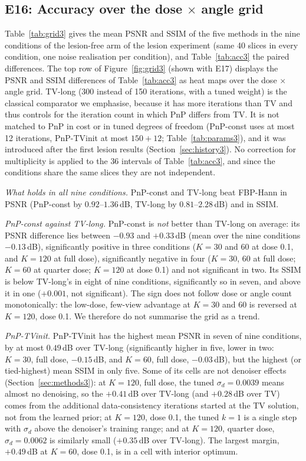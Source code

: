 \subsection{E16: Accuracy over the dose $\times$ angle grid}\label{sec:e16}
Table~\ref{tab:grid3} gives the mean PSNR and SSIM of the five methods in the nine conditions of the lesion-free arm of the lesion experiment (same 40 slices in every condition, one noise realisation per condition), and Table~\ref{tab:acc3} the paired differences. The top row of Figure~\ref{fig:grid3} (shown with E17) displays the PSNR and SSIM differences of Table~\ref{tab:acc3} as heat maps over the dose $\times$ angle grid.
TV-long (300 instead of 150 iterations, with a tuned weight) is the classical comparator we emphasise, because it has more iterations than TV and thus controls for the iteration count in which PnP differs from TV. It is not matched to PnP in cost or in tuned degrees of freedom (PnP-const uses at most 12 iterations, PnP-TVinit at most $150+12$; Table~\ref{tab:params3}), and it was introduced after the first lesion results (Section~\ref{sec:history3}). No correction for multiplicity is applied to the $36$ intervals of Table~\ref{tab:acc3}, and since the conditions share the same slices they are not independent.

\emph{What holds in all nine conditions.} PnP-const and TV-long beat FBP-Hann in PSNR (PnP-const by $0.92$--$1.36$\,dB, TV-long by $0.81$--$2.28$\,dB) and in SSIM.

\emph{PnP-const against TV-long.} PnP-const is \emph{not} better than TV-long on average: its PSNR difference lies between $-0.93$ and $+0.33$\,dB (mean over the nine conditions $-0.13$\,dB), significantly positive in three conditions ($K=30$ and $60$ at dose 0.1, and $K=120$ at full dose), significantly negative in four ($K=30$, $60$ at full dose; $K=60$ at quarter dose; $K=120$ at dose 0.1) and not significant in two.
Its SSIM is below TV-long's in eight of nine conditions, significantly so in seven, and above it in one ($+0.001$, not significant). The sign does not follow dose or angle count monotonically: the low-dose, few-view advantage at $K=30$ and $60$ is reversed at $K=120$, dose 0.1. We therefore do not summarise the grid as a trend.

\emph{PnP-TVinit.} PnP-TVinit has the highest mean PSNR in seven of nine conditions, by at most $0.49$\,dB over TV-long
(significantly higher in five, lower in two: $K=30$, full dose, $-0.15$\,dB, and $K=60$, full dose, $-0.03$\,dB), but the highest (or tied-highest) mean SSIM in only five. Some of its cells are not denoiser effects (Section~\ref{sec:methods3}): at $K=120$, full dose, the tuned $\sigma_d=0.0039$ means almost no denoising, so
the $+0.41$\,dB over TV-long (and $+0.28$\,dB over TV) comes from the additional data-consistency iterations started at the TV solution, not from the learned prior; at $K=120$, dose 0.1, the tuned $k=1$ is a single step with $\sigma_d$ above the denoiser's training range; and at $K=120$, quarter dose, $\sigma_d=0.0062$ is similarly small ($+0.35$\,dB over TV-long).
The largest margin, $+0.49$\,dB at $K=60$, dose 0.1, is in a cell with interior optimum.

